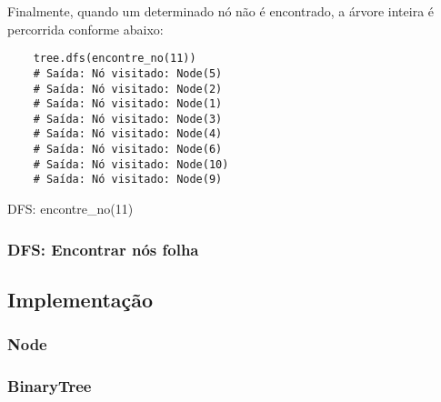 Finalmente, quando um determinado nó não é encontrado, a árvore inteira é percorrida conforme abaixo:

\begin{listing}[H]
    \begin{verbatim}
    tree.dfs(encontre_no(11))
    # Saída: Nó visitado: Node(5)
    # Saída: Nó visitado: Node(2)
    # Saída: Nó visitado: Node(1)
    # Saída: Nó visitado: Node(3)
    # Saída: Nó visitado: Node(4)
    # Saída: Nó visitado: Node(6)
    # Saída: Nó visitado: Node(10)
    # Saída: Nó visitado: Node(9)
    \end{verbatim}
    \caption{DFS: encontre\_no(11)}
    \label{listing:dfs-encontra-no-11}
\end{listing}

\subsubsection{DFS: Encontrar nós folha}

\subsection{Implementação}
\subsubsection{Node}
\subsubsection{BinaryTree}
